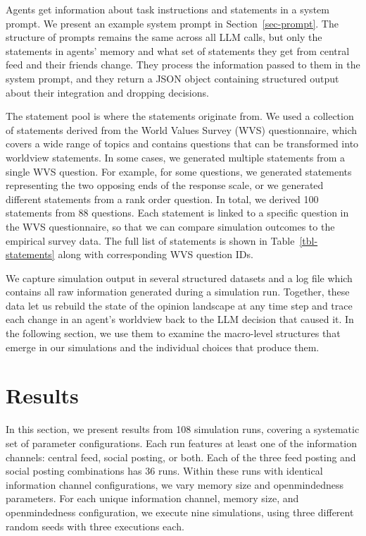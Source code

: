 \documentclass[]{ceurart}
\begin{document}
Agents get information about task instructions and statements in a
system prompt. We present an example system prompt in
Section~\ref{sec-prompt}. The structure of prompts remains the same
across all LLM calls, but only the statements in agents' memory and what
set of statements they get from central feed and their friends change.
They process the information passed to them in the system prompt, and
they return a JSON object containing structured output about their
integration and dropping decisions.

The statement pool is where the statements originate from. We used a
collection of statements derived from the World Values Survey (WVS)
questionnaire, which covers a wide range of topics and contains
questions that can be transformed into worldview statements. In some
cases, we generated multiple statements from a single WVS question. For
example, for some questions, we generated statements representing the
two opposing ends of the response scale, or we generated different
statements from a rank order question. In total, we derived 100
statements from 88 questions. Each statement is linked to a specific
question in the WVS questionnaire, so that we can compare simulation
outcomes to the empirical survey data. The full list of statements is
shown in Table~\ref{tbl-statements} along with corresponding WVS
question IDs.

We capture simulation output in several structured datasets and a log
file which contains all raw information generated during a simulation
run. Together, these data let us rebuild the state of the opinion
landscape at any time step and trace each change in an agent's worldview
back to the LLM decision that caused it. In the following section, we
use them to examine the macro-level structures that emerge in our
simulations and the individual choices that produce them.

\section{Results}\label{results}

In this section, we present results from 108 simulation runs, covering a
systematic set of parameter configurations. Each run features at least
one of the information channels: central feed, social posting, or both.
Each of the three feed posting and social posting combinations has 36
runs. Within these runs with identical information channel
configurations, we vary memory size and openmindedness parameters. For
each unique information channel, memory size, and openmindedness
configuration, we execute nine simulations, using three different random
seeds with three executions each.
\end{document}
